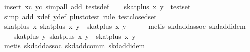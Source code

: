 \begin{isabellebody}
\ {}insert\ xc\ yc{}\ simp{}all\ add{}\ tests{}def{}\isanewline
\isanewline
\ \ \isamarkupfalse%
\ {}skat{}plus\ x\ y\ {}\ test{}set{}\isanewline
\ \ \ \ \isamarkupfalse%
\ {}simp\ add{}\ x{}{}def\ y{}{}def\ plus{}to{}test{}\ rule\ test{}closed{}set{}\isanewline
\isanewline
\ \ \isamarkupfalse%
\ {}skat{}plus\ x\ {}skat{}plus\ x\ y{}\ {}\ skat{}plus\ x\ y{}\isanewline
\ \ \ \ \isamarkupfalse%
\ {}metis\ skd{}add{}assoc\ skd{}add{}idem{}\isanewline
\isanewline
\ \ \isamarkupfalse%
\ {}skat{}plus\ y\ {}skat{}plus\ x\ y{}\ {}\ skat{}plus\ x\ y{}\isanewline
\ \ \ \ \isamarkupfalse%
\ {}metis\ skd{}add{}assoc\ skd{}add{}comm\ skd{}add{}idem{}\isanewline
\isanewline
\ \ \isamarkupfalse%

\end{isabellebody}
